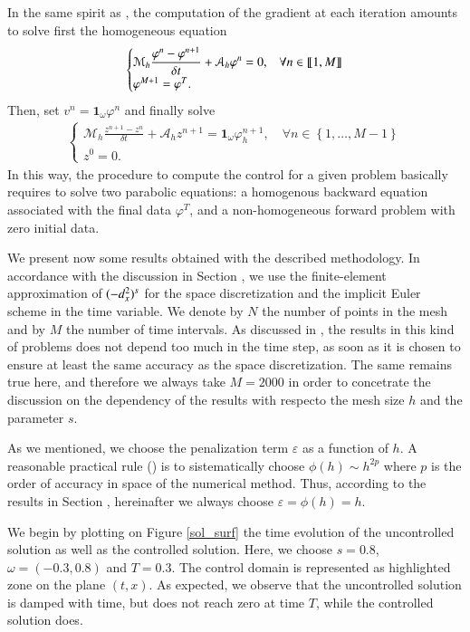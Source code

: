 In the same spirit as \cite{}, the computation of the gradient at each iteration amounts to solve first the homogeneous equation 
%
\begin{align}
	\begin{cases}
		\displaystyle\mathcal M_h \frac{\varphi^n-\varphi^{n+1}}{\delta t}+\mathcal A_h \varphi^n=0, & \forall n\in\llbracket 1,M\rrbracket
		\\
		\varphi^{M+1}=\varphi^T. 
	\end{cases}
\end{align}
%
Then, set $v^n=\mathbf{1}_\omega\varphi^n$ and finally solve 
%
\begin{align}\label{frac_heat_num}
	\begin{cases}
		\displaystyle\mathcal M_h \frac{z^{n+1}-z^n}{\delta t}+\mathcal A_h z^{n+1}=\mathbf{1}_\omega \varphi_h^{n+1}, \quad \forall n\in \left\{1,\ldots,M-1\right\}
		\\
		z^0=0. 
	\end{cases}
\end{align}
%
In this way, the procedure to compute the control for a given problem basically requires to solve two parabolic equations: a homogenous backward equation associated with the final data $\varphi^T$, and a non-homogeneous forward problem with zero initial data. 

We present now some results obtained with the described methodology. In accordance with the discussion in Section , we use the finite-element approximation of $(-d_x^2)^{s}$ for the space discretization and the implicit Euler scheme in the time variable. We denote by $N$ the number of points in the mesh and by $M$ the number of time intervals. As discussed in , the results in this kind of problems does not depend too much in the time step, as soon as it is chosen to ensure at least the same accuracy as the space discretization. The same remains true here, and therefore we always take $M=2000$ in order to concetrate the discussion on the dependency of the results with respecto the mesh size $h$ and the parameter $s$.

As we mentioned, we choose the penalization term $\varepsilon$ as a function of $h$. A reasonable practical rule (\cite{}) is to sistematically choose $\phi(h)\sim h^{2p}$ where $p$ is the order of accuracy in space of the numerical method. Thus, according to the results in Section , hereinafter we always choose $\varepsilon=\phi(h)=h$.

We begin by plotting on Figure \ref{sol_surf} the time evolution of the uncontrolled solution as well as the controlled solution. Here, we choose $s=0.8$, $\omega=(-0.3,0.8)$ and $T=0.3$. The control domain is represented as highlighted zone on the plane $(t,x)$. As expected, we observe that the uncontrolled solution is damped with time, but does not reach zero at time $T$, while the controlled solution does. 


